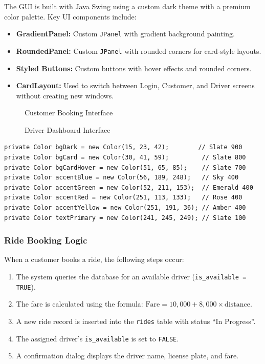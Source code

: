 \documentclass[fonts]{icst}
\begin{document}
The GUI is built with Java Swing using a custom dark theme with a premium color palette. Key UI components include:

\begin{itemize}
    \item \textbf{GradientPanel:} Custom \texttt{JPanel} with gradient background painting.
    \item \textbf{RoundedPanel:} Custom \texttt{JPanel} with rounded corners for card-style layouts.
    \item \textbf{Styled Buttons:} Custom buttons with hover effects and rounded corners.
    \item \textbf{CardLayout:} Used to switch between Login, Customer, and Driver screens without creating new windows.
\end{itemize}

\begin{figure}[h!]
    \centering
    \caption{Customer Booking Interface}
    \label{fig:ui_customer}
\end{figure}

\begin{figure}[h!]
    \centering
    \caption{Driver Dashboard Interface}
    \label{fig:ui_driver}
\end{figure}

\begin{lstlisting}[caption={Custom color palette for dark theme UI}]
private Color bgDark = new Color(15, 23, 42);        // Slate 900
private Color bgCard = new Color(30, 41, 59);         // Slate 800
private Color bgCardHover = new Color(51, 65, 85);    // Slate 700
private Color accentBlue = new Color(56, 189, 248);   // Sky 400
private Color accentGreen = new Color(52, 211, 153);  // Emerald 400
private Color accentRed = new Color(251, 113, 133);   // Rose 400
private Color accentYellow = new Color(251, 191, 36); // Amber 400
private Color textPrimary = new Color(241, 245, 249); // Slate 100
\end{lstlisting}

\subsubsection{Ride Booking Logic}

When a customer books a ride, the following steps occur:

\begin{enumerate}
    \item The system queries the database for an available driver (\texttt{is\_available = TRUE}).
    \item The fare is calculated using the formula: $\text{Fare} = 10{,}000 + 8{,}000 \times \text{distance}$.
    \item A new ride record is inserted into the \texttt{rides} table with status ``In Progress''.
    \item The assigned driver's \texttt{is\_available} is set to \texttt{FALSE}.
    \item A confirmation dialog displays the driver name, license plate, and fare.
\end{enumerate}
\end{document}
